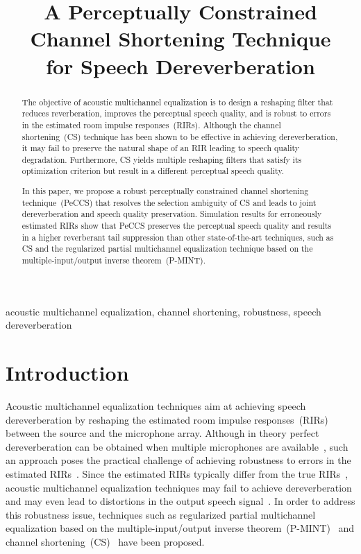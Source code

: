 \documentclass{article}
\title{A Perceptually Constrained Channel Shortening Technique
\\ for Speech Dereverberation}
\begin{document}
\ninept
%
\maketitle
%
\begin{abstract}
The objective of acoustic multichannel equalization is to design a reshaping filter that reduces reverberation, improves the perceptual speech quality, and is robust to errors in the estimated room impulse responses~(RIRs).
Although the channel shortening~(CS) technique has been shown to be effective in achieving dereverberation, it may fail to preserve the natural shape of an RIR leading to speech quality degradation.
Furthermore, CS yields multiple reshaping filters that satisfy its optimization criterion but result in a different perceptual speech quality.

In this paper, we propose a robust perceptually constrained channel shortening technique~(PeCCS) that resolves the selection ambiguity of CS and leads to joint dereverberation and speech quality preservation.
Simulation results for erroneously estimated RIRs show that PeCCS preserves the perceptual speech quality and results in a higher reverberant tail suppression than other state-of-the-art techniques, such as CS and the regularized partial multichannel equalization technique based on the multiple-input/output inverse theorem~(P-MINT).

\end{abstract}
%
\begin{keywords}
acoustic multichannel equalization, channel shortening, robustness, speech dereverberation
\end{keywords}
%
\section{Introduction}
\label{sec:intro}
Acoustic multichannel equalization techniques aim at achieving speech dereverberation by reshaping the estimated room impulse responses~(RIRs) between the source and the microphone array.
Although in theory perfect dereverberation can be obtained when multiple microphones are available~\cite{Miyoshi_ITASS_1988,Hacihabibouglu_ITASLP_2012}, such an approach poses the practical challenge of achieving robustness to errors in the estimated RIRs~\cite{Hikichi_EURASIP_2007, Zhang_IWAENC_2010, Kodrasi_IWAENC_2012}.
Since the estimated RIRs typically differ from the true RIRs~\cite{Hasan_EUSIPCO_2006}, acoustic multichannel equalization techniques may fail to achieve dereverberation and may even lead to distortions in the output speech signal~\cite{Radlovic_ITSA_2000}.
In order to address this robustness issue, techniques such as regularized partial multichannel equalization based on the multiple-input/output inverse theorem~(P-MINT)~\cite{Kodrasi_IWAENC_2012} and channel shortening~(CS)~\cite{Zhang_IWAENC_2010,Kallinger_ICASSP_2006} have been proposed.
\end{document}
